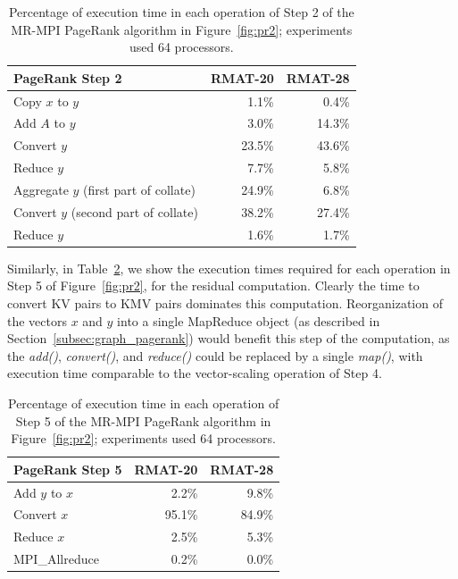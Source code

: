 \begin{table}[htb]
\begin{center}
\begin{tabular}{|l|r|r|}
\hline 
PageRank Step 2 & RMAT-20 & RMAT-28 \\
\hline
Copy $x$ to $y$                       &  1.1\% &  0.4\%\\
Add $A$ to $y$                        &  3.0\% & 14.3\% \\
Convert $y$                           & 23.5\% & 43.6\% \\
Reduce $y$                            &  7.7\% &  5.8\% \\
Aggregate $y$ (first part of collate) & 24.9\% &  6.8\% \\
Convert $y$ (second part of collate)  & 38.2\% & 27.4\% \\
Reduce $y$                            &  1.6\% &  1.7\% \\
\hline
\end{tabular}
\caption{Percentage of execution time in each operation of Step 2 of the MR-MPI 
PageRank algorithm in Figure~\ref{fig:pr2}; experiments used 64 processors.}
\label{table:prdetail2}
\end{center}
\end{table}

Similarly, in Table~\ref{table:prdetail5}, we show the execution times
required for each operation in Step 5 of Figure~\ref{fig:pr2}, for the
residual computation.  Clearly the time to convert KV pairs to KMV
pairs dominates this computation.  Reorganization of the vectors $x$
and $y$ into a single MapReduce object (as described in
Section~\ref{subsec:graph_pagerank}) would benefit this step of the
computation, as the {\it add()}, {\it convert()}, and {\it reduce()}
could be replaced by a single {\it map()}, with execution time
comparable to the vector-scaling operation of Step 4.

\begin{table}[htb]
\begin{center}
\begin{tabular}{|l|r|r|}
\hline 
PageRank Step 5 & RMAT-20 & RMAT-28 \\
\hline
Add $y$ to $x$ &  2.2\% &  9.8\% \\
Convert $x$    & 95.1\% & 84.9\% \\
Reduce $x$     &  2.5\% &  5.3\% \\
MPI\_Allreduce &  0.2\% &  0.0\% \\
\hline
\end{tabular}
\caption{Percentage of execution time in each operation of Step 5 of
the MR-MPI PageRank algorithm in Figure~\ref{fig:pr2}; experiments
used 64 processors.}
\label{table:prdetail5}
\end{center}
\end{table}

